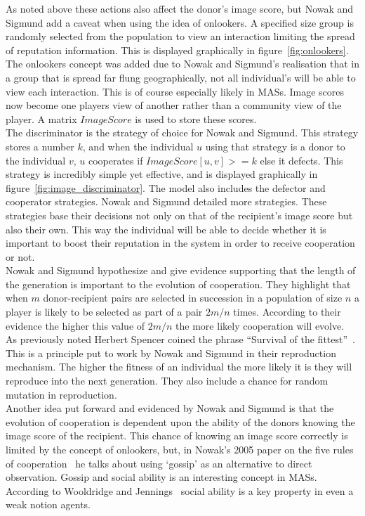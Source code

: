 \documentclass[]{final_report}
\begin{document}
As noted above these actions also affect the donor's image score, but Nowak and Sigmund add a caveat when using the idea of onlookers. A specified size group is randomly selected from the population to view an interaction limiting the spread of reputation information. This is displayed graphically in figure~\ref{fig:onlookers}. The onlookers concept was added due to Nowak and Sigmund's realisation that in a group that is spread far flung geographically, not all individual's will be able to view each interaction. This is of course especially likely in MASs. Image scores now become one players view of another rather than a community view of the player. A matrix $ImageScore$ is used to store these scores.\\
The discriminator is the strategy of choice for Nowak and Sigmund. This strategy stores a number $k$, and when the individual $u$ using that strategy is a donor to the individual $v$, $u$ cooperates if $ImageScore[u,v]>=k$ else it defects. This strategy is incredibly simple yet effective, and is displayed graphically in figure~\ref{fig:image_discriminator}. The model also includes the defector and cooperator strategies. Nowak and Sigmund detailed more strategies. These strategies base their decisions not only on that of the recipient's image score but also their own. This way the individual will be able to decide whether it is important to boost their reputation in the system in order to receive cooperation or not.\\
Nowak and Sigmund hypothesize and give evidence supporting that the length of the generation is important to the evolution of cooperation. They highlight that when $m$ donor-recipient pairs are selected in succession in a population of size $n$ a player is likely to be selected as part of a pair $2m/n$ times. According to their evidence the higher this value of $2m/n$ the more likely cooperation will evolve.\\
As previously noted Herbert Spencer coined the phrase ``Survival of the fittest''~\cite{spencer1864principles}. This is a principle put to work by Nowak and Sigmund in their reproduction mechanism. The higher the fitness of an individual the more likely it is they will reproduce into the next generation. They also include a chance for random mutation in  reproduction.\\
Another idea put forward and evidenced by Nowak and Sigmund is that the evolution of cooperation is dependent upon the ability of the donors knowing the image score of the recipient. This chance of knowing an image score correctly is limited by the concept of onlookers, but, in Nowak's 2005 paper on the five rules of cooperation~\cite{five_rules_coop} he talks about using `gossip' as an alternative to direct observation. Gossip and social ability is an interesting concept in MASs. According to Wooldridge and Jennings~\cite{wooldridge_jennings_1995} social ability is a key property in even a weak notion agents.\\
\end{document}
